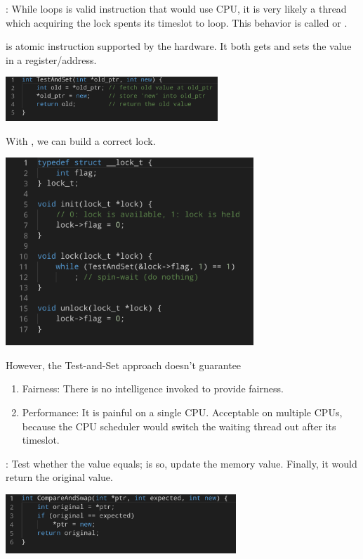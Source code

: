     : While loops is valid instruction that would use CPU,
    it is very likely a thread which acquiring the lock spents its timeslot to 
    loop. This behavior is called  or .


     is atomic instruction supported by the hardware. It 
    both gets and sets the value in a register/address. 

    \includegraphics[width=0.6\textwidth]{chapters/Cucurrency/Cucurrency/test_and_set.png}

    With , we can build a correct lock.

    \includegraphics[width=0.7\textwidth]{chapters/Cucurrency/Cucurrency/spin_locks_test_set.png}

    However, the Test-and-Set approach doesn't guarantee
    \begin{enumerate}
        \item Fairness: There is no intelligence invoked to provide fairness.
        \item Performance: It is painful on a single CPU. Acceptable on multiple CPUs,
        because the CPU scheduler would switch the waiting thread out after its timeslot.
    \end{enumerate}


    : Test whether the value equals; is so, 
    update the memory value. Finally,
    it would return the original value.

    \includegraphics[width=0.65\textwidth]{chapters/Cucurrency/Cucurrency/compare_and_swap.png}

